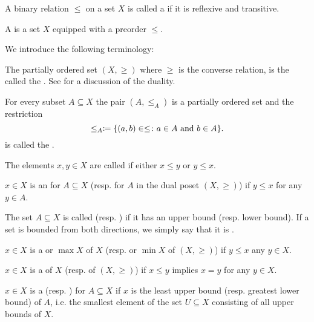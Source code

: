 \begin{definition}\label{def:preordered_set}\cite{nLab:preorder}
  A binary relation \( \leq \) on a set \( X \) is called a  if it is reflexive and transitive.

  A  is a set \( X \) equipped with a preorder \( \leq \). 

  We introduce the following terminology:
  \begin{defenum}
     The partially ordered set \( (X, \geq) \) where \( \geq \) is the converse relation, is the called the . See  for a discussion of the duality.

     For every subset \( A \subseteq X \) the pair \( (A, \leq_A) \) is a partially ordered set and the restriction
    \begin{equation*}
      \leq_A \coloneqq \{ (a, b) \in \leq \colon a \in A \text{ and } b \in A \}.
    \end{equation*}
    is called the .

     The elements \( x, y \in X \) are called  if either \( x \leq y \) or \( y \leq x \).

    \cite[170]{Enderton1977} \( x \in X \) is an  for \( A \subseteq X \) (resp.  for \( A \) in the dual poset \( (X, \geq) \)) if \( y \leq x \) for any \( y \in A \).

     The set \( A \subseteq X \) is called  (resp. ) if it has an upper bound (resp. lower bound). If a set is bounded from both directions, we simply say that it is .

    \cite[171]{Enderton1977} \( x \in X \) is a  or  \( \max X \) of \( X \) (resp.  or  \( \min X \) of \( (X, \geq) \)) if \( y \leq x \) any \( y \in X \).

    \cite[170]{Enderton1977} \( x \in X \) is a  of \( X \) (resp.  of \( (X, \geq) \)) if \( x \leq y \) implies \( x = y \) for any \( y \in X \).

    \cite[170]{Enderton1977} \( x \in X \) is a  (resp. ) for \( A \subseteq X \) if \( x \) is the least upper bound (resp. greatest lower bound) of \( A \), i.e. the smallest element of the set \( U \subseteq X \) consisting of all upper bounds of \( X \).
  \end{defenum}
\end{definition}

